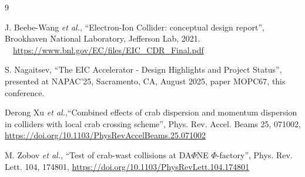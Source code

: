 \documentclass[letter,
keeplastbox,   %
]{jacow}
\begin{document}
\begin{thebibliography}{9} %

	J. Beebe-Wang \emph{et al.},
	\textquotedblleft{Electron-Ion Collider: conceptual design report}\textquotedblright, Brookhaven National Laboratory, Jefferson Lab, 2021. \ \  \url{https://www.bnl.gov/EC/files/EIC_CDR_Final.pdf}

S. Nagaitsev,
  \textquotedblleft{The EIC Accelerator - Design Highlights and Project Status}\textquotedblright, presented at NAPAC’25, Sacramento, CA, August 2025, paper MOPC67, this conference.

Derong Xu {\it et al.},\textquotedblleft{Combined effects of crab dispersion and momentum dispersion in colliders with local crab crossing scheme}\textquotedblright, Phys. Rev. Accel. Beams 25, 071002, \url{https://doi.org/10.1103/PhysRevAccelBeams.25.071002}

 M. Zobov \emph{et al.},  \textquotedblleft{Test of crab-wast collisions at DA$\Phi$NE $\Phi$-factory}\textquotedblright, Phys. Rev. Lett. 104, 174801, \url{https://doi.org/10.1103/PhysRevLett.104.174801}

\end{thebibliography}
\end{document}
